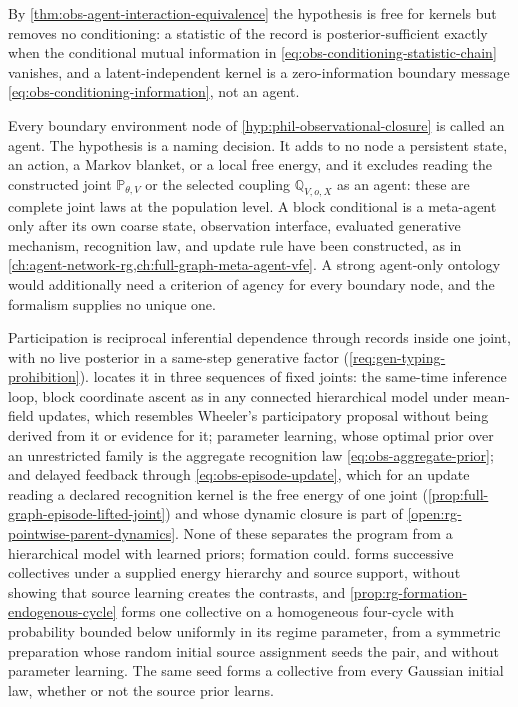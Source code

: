 By \cref{thm:obs-agent-interaction-equivalence} the hypothesis is free for
kernels but removes no conditioning: a statistic of the record is
posterior-sufficient exactly when the conditional mutual information in
\eqref{eq:obs-conditioning-statistic-chain} vanishes, and a latent-independent
kernel is a zero-information boundary message
\eqref{eq:obs-conditioning-information}, not an agent.

Every boundary environment node of \cref{hyp:phil-observational-closure} is
called an agent. The hypothesis is a naming decision. It adds to no node a
persistent state, an action, a Markov blanket, or a local free energy, and it
excludes reading the constructed joint \(\mathbb P_{\theta,V}\) or the selected
coupling \(\mathbb Q_{V,o,X}\) as an agent: these are complete joint laws at the
population level. A block conditional is a meta-agent only after its own coarse
state, observation interface, evaluated generative mechanism, recognition law,
and update rule have been constructed, as in
\cref{ch:agent-network-rg,ch:full-graph-meta-agent-vfe}. A strong agent-only
ontology would additionally need a criterion of agency for every boundary node,
and the formalism supplies no unique one.

Participation is reciprocal inferential dependence through records inside one
joint, with no live posterior in a same-step generative factor
(\cref{req:gen-typing-prohibition}).  locates
it in three sequences of fixed joints: the same-time inference loop, block
coordinate ascent as in any connected hierarchical model under mean-field
updates, which resembles Wheeler's participatory proposal \citep{Wheeler1990}
without being derived from it or evidence for it; parameter learning, whose
optimal prior over an unrestricted family is the aggregate recognition law
\eqref{eq:obs-aggregate-prior}; and delayed feedback through
\eqref{eq:obs-episode-update}, which for an update reading a declared
recognition kernel is the free energy of one joint
(\cref{prop:full-graph-episode-lifted-joint}) and whose dynamic closure is
part of \cref{open:rg-pointwise-parent-dynamics}. None of these separates the program
from a hierarchical model with learned priors; formation could.
 forms successive collectives under a
supplied energy hierarchy and source support, without showing that source
learning creates the contrasts, and \cref{prop:rg-formation-endogenous-cycle}
forms one collective on a homogeneous four-cycle with probability bounded below
uniformly in its regime parameter, from a symmetric preparation whose random
initial source assignment seeds the pair, and without parameter learning. The
same seed forms a collective from every Gaussian initial law, whether or not the
source prior learns.

